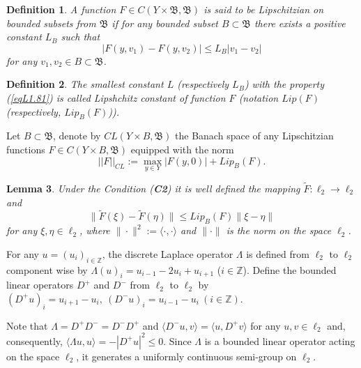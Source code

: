 \documentclass{amsart}%
\newtheorem{lemma}{Lemma}[section]
\newtheorem{definition}[lemma]{Definition}
\begin{document}
\begin{definition}\label{defL1.8} A function $F\in C(Y\times \mathfrak B,\mathfrak
B)$ is said to be Lipschitzian on bounded subsets from $\mathfrak
B$ if for any bounded subset $B\subset \mathfrak B$ there exists a
positive constant $L_{B}$ such that
\begin{equation}\label{eqL1.82}
|F(y,v_1)-F(y,v_2)|\le L_{B} |v_1-v_2|
\end{equation}
for any $v_1, v_2 \in B \subset \mathfrak B$.
\end{definition}

\begin{definition}\label{defL2.8}
The smallest constant $L$ (respectively $L_{B}$) with the property
(\ref{eqL1.81}) is called Lipshchitz constant of function $F$
(notation $Lip(F)$ (respectively, $Lip_{B}(F)$)).
\end{definition}

Let $B \subset \mathfrak B$, denote by $CL(Y\times B,\mathfrak B)$
the Banach space of any Lipschitzian functions $F\in C(Y\times
B,\mathfrak B)$ equipped with the norm
\begin{equation}
||F||_{CL}:=\max\limits_{y\in Y}|F(y,0)|+Lip_{B}(F).\nonumber
\end{equation}

\begin{lemma}\label{l2.2} \cite{BLW_2001} Under the Condition (\textbf{C2})
it is well defined the mapping $\widetilde{F}:\ell_{2}\to
\ell_{2}$ and
\begin{equation}\label{eq2.2}
\|\widetilde{F}(\xi)-\widetilde{F}(\eta)\|\le Lip_{B}(F)\|\xi
-\eta \| \nonumber
\end{equation}
for any $\xi,\eta\in \ell_{2}$, where $\|\cdot\|^{2}:=\langle
\cdot,\cdot \rangle$ and $\|\cdot \|$ is the norm on the space
$\ell_{2}$.
\end{lemma}

For any $u = (u_{i})_{i\in \mathbb Z}$, the discrete Laplace
operator $\Lambda$ is defined \cite[Ch.III]{HK_2023} from
$\ell_{2}$ to $\ell_{2}$ component wise by $\Lambda(u)_{i} =
u_{i-1} - 2u_{i} + u_{i+1}$ ($i\in \mathbb Z$). Define the
bounded linear operators $D^{+}$ and $D^{-}$ from $\ell_{2}$ to
$\ell_{2}$ by $(D^{+}u)_{i} = u_{i+1} - u_{i},\ (D^{-}u)_{i} =
u_{i-1} - u_{i}\ (i\in \mathbb Z)$.

Note that $\Lambda = D^{+}D^{-} = D^{-}D^{+}$ and $\langle D^{-}u,
v\rangle = \langle u, D^{+}v\rangle $ for any $u,v\in \ell_{2}$
and, consequently, $\langle \Lambda u,u \rangle = -|D^{+}u|^{2}\le
0$. Since $\Lambda$ is a bounded linear operator acting on the
space $\ell_{2}$, it generates a uniformly continuous semi-group
on $\ell_{2}$.
\end{document}

